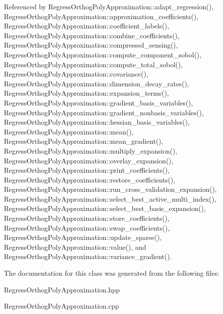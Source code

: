 Referenced by Regress\+Orthog\+Poly\+Approximation\+::adapt\+\_\+regression(), Regress\+Orthog\+Poly\+Approximation\+::approximation\+\_\+coefficients(), Regress\+Orthog\+Poly\+Approximation\+::coefficient\+\_\+labels(), Regress\+Orthog\+Poly\+Approximation\+::combine\+\_\+coefficients(), Regress\+Orthog\+Poly\+Approximation\+::compressed\+\_\+sensing(), Regress\+Orthog\+Poly\+Approximation\+::compute\+\_\+component\+\_\+sobol(), Regress\+Orthog\+Poly\+Approximation\+::compute\+\_\+total\+\_\+sobol(), Regress\+Orthog\+Poly\+Approximation\+::covariance(), Regress\+Orthog\+Poly\+Approximation\+::dimension\+\_\+decay\+\_\+rates(), Regress\+Orthog\+Poly\+Approximation\+::expansion\+\_\+terms(), Regress\+Orthog\+Poly\+Approximation\+::gradient\+\_\+basis\+\_\+variables(), Regress\+Orthog\+Poly\+Approximation\+::gradient\+\_\+nonbasis\+\_\+variables(), Regress\+Orthog\+Poly\+Approximation\+::hessian\+\_\+basis\+\_\+variables(), Regress\+Orthog\+Poly\+Approximation\+::mean(), Regress\+Orthog\+Poly\+Approximation\+::mean\+\_\+gradient(), Regress\+Orthog\+Poly\+Approximation\+::multiply\+\_\+expansion(), Regress\+Orthog\+Poly\+Approximation\+::overlay\+\_\+expansion(), Regress\+Orthog\+Poly\+Approximation\+::print\+\_\+coefficients(), Regress\+Orthog\+Poly\+Approximation\+::restore\+\_\+coefficients(), Regress\+Orthog\+Poly\+Approximation\+::run\+\_\+cross\+\_\+validation\+\_\+expansion(), Regress\+Orthog\+Poly\+Approximation\+::select\+\_\+best\+\_\+active\+\_\+multi\+\_\+index(), Regress\+Orthog\+Poly\+Approximation\+::select\+\_\+best\+\_\+basis\+\_\+expansion(), Regress\+Orthog\+Poly\+Approximation\+::store\+\_\+coefficients(), Regress\+Orthog\+Poly\+Approximation\+::swap\+\_\+coefficients(), Regress\+Orthog\+Poly\+Approximation\+::update\+\_\+sparse(), Regress\+Orthog\+Poly\+Approximation\+::value(), and Regress\+Orthog\+Poly\+Approximation\+::variance\+\_\+gradient().



The documentation for this class was generated from the following files\+:\begin{DoxyCompactItemize}
\item 
Regress\+Orthog\+Poly\+Approximation.\+hpp\item 
Regress\+Orthog\+Poly\+Approximation.\+cpp\end{DoxyCompactItemize}
